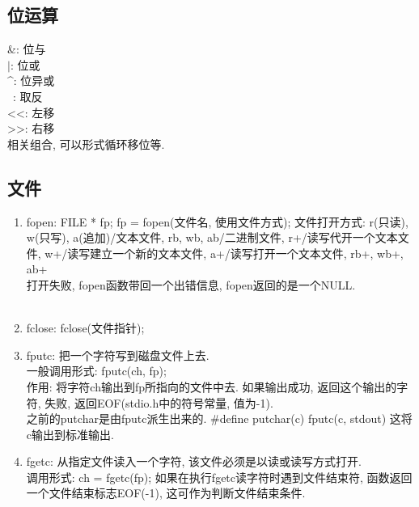 \documentclass[a4paper,10pt,english]{article}
\begin{document}
\subsection {位运算}
\&: 位与 \\
$\vert$: 位或 \\
\^{}: 位异或 \\
~: 取反 \\
<<: 左移 \\
>>: 右移 \\
相关组合, 可以形式循环移位等.

\subsection {文件}
\begin {enumerate}
\item {fopen}:
FILE * fp; fp = fopen(文件名, 使用文件方式); 文件打开方式: r(只读), w(只写), a(追加)/文本文件, rb, wb, ab/二进制文件, r+/读写代开一个文本文件, w+/读写建立一个新的文本文件, a+/读写打开一个文本文件, rb+, wb+, ab+ \\
打开失败, fopen函数带回一个出错信息, fopen返回的是一个NULL.\\\\
\item {fclose}: fclose(文件指针); 
\item {fputc}: 把一个字符写到磁盘文件上去.\\
一般调用形式: fputc(ch, fp); \\
作用: 将字符ch输出到fp所指向的文件中去. 如果输出成功, 返回这个输出的字符, 失败, 返回EOF(stdio.h中的符号常量, 值为-1).\\
之前的putchar是由fputc派生出来的. \#define putchar(c) fputc(c, stdout)  这将c输出到标准输出. \\
\item {fgetc}: 从指定文件读入一个字符, 该文件必须是以读或读写方式打开. \\
调用形式: ch = fgetc(fp); 如果在执行fgetc读字符时遇到文件结束符, 函数返回一个文件结束标志EOF(-1), 这可作为判断文件结束条件.


\end{enumerate}
\end{document}
